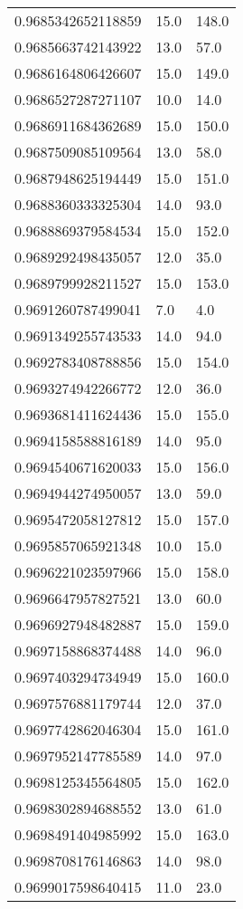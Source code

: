 \begin{center}
\begin{supertabular}[H]{p{0.30\textwidth}p{0.05\textwidth}p{0.05\textwidth}}
0.9685342652118859 & 15.0 & 148.0 \\ 
0.9685663742143922 & 13.0 & 57.0 \\ 
0.9686164806426607 & 15.0 & 149.0 \\ 
0.9686527287271107 & 10.0 & 14.0 \\ 
0.9686911684362689 & 15.0 & 150.0 \\ 
0.9687509085109564 & 13.0 & 58.0 \\ 
0.9687948625194449 & 15.0 & 151.0 \\ 
0.9688360333325304 & 14.0 & 93.0 \\ 
0.9688869379584534 & 15.0 & 152.0 \\ 
0.9689292498435057 & 12.0 & 35.0 \\ 
0.9689799928211527 & 15.0 & 153.0 \\ 
0.9691260787499041 & 7.0 & 4.0 \\ 
0.9691349255743533 & 14.0 & 94.0 \\ 
0.9692783408788856 & 15.0 & 154.0 \\ 
0.9693274942266772 & 12.0 & 36.0 \\ 
0.9693681411624436 & 15.0 & 155.0 \\ 
0.9694158588816189 & 14.0 & 95.0 \\ 
0.9694540671620033 & 15.0 & 156.0 \\ 
0.9694944274950057 & 13.0 & 59.0 \\ 
0.9695472058127812 & 15.0 & 157.0 \\ 
0.9695857065921348 & 10.0 & 15.0 \\ 
0.9696221023597966 & 15.0 & 158.0 \\ 
0.9696647957827521 & 13.0 & 60.0 \\ 
0.9696927948482887 & 15.0 & 159.0 \\ 
0.9697158868374488 & 14.0 & 96.0 \\ 
0.9697403294734949 & 15.0 & 160.0 \\ 
0.9697576881179744 & 12.0 & 37.0 \\ 
0.9697742862046304 & 15.0 & 161.0 \\ 
0.9697952147785589 & 14.0 & 97.0 \\ 
0.9698125345564805 & 15.0 & 162.0 \\ 
0.9698302894688552 & 13.0 & 61.0 \\ 
0.9698491404985992 & 15.0 & 163.0 \\ 
0.9698708176146863 & 14.0 & 98.0 \\ 
0.9699017598640415 & 11.0 & 23.0 \\ 

\end{supertabular}
\end{center}
